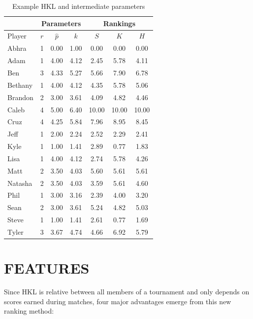 \documentclass[letterpaper, 10 pt, conference]{ieeeconf}  %
\begin{document}
\begin{table}[hb]
        \begin{tabular}{lccc|ccc}
                \toprule
                        & \multicolumn{3}{c}{Parameters} & \multicolumn{3}{c}{Rankings} \\
                \midrule
                Player  & $r$   & $\hat{p}$ & $k$ & $S$ & $K$   & $H$ \\
                \midrule
                Abhra	& 1	& 0.00	& 1.00	& 0.00	& 0.00	& 0.00 \\
                Adam	& 1	& 4.00	& 4.12	& 2.45	& 5.78	& 4.11 \\
                Ben	& 3	& 4.33	& 5.27	& 5.66	& 7.90	& 6.78 \\
                Bethany	& 1	& 4.00	& 4.12	& 4.35	& 5.78	& 5.06 \\
                Brandon	& 2	& 3.00	& 3.61	& 4.09	& 4.82	& 4.46 \\
                Caleb	& 4	& 5.00	& 6.40	& 10.00	& 10.00	& 10.00 \\
                Cruz	& 4	& 4.25	& 5.84	& 7.96	& 8.95	& 8.45 \\
                Jeff	& 1	& 2.00	& 2.24	& 2.52	& 2.29	& 2.41 \\
                Kyle	& 1	& 1.00	& 1.41	& 2.89	& 0.77	& 1.83 \\
                Lisa	& 1	& 4.00	& 4.12	& 2.74	& 5.78	& 4.26 \\
                Matt	& 2	& 3.50	& 4.03	& 5.60	& 5.61	& 5.61 \\
                Natasha	& 2	& 3.50	& 4.03	& 3.59	& 5.61	& 4.60 \\
                Phil	& 1	& 3.00	& 3.16	& 2.39	& 4.00	& 3.20 \\
                Sean	& 2	& 3.00	& 3.61	& 5.24	& 4.82	& 5.03 \\
                Steve	& 1	& 1.00	& 1.41	& 2.61	& 0.77	& 1.69 \\
                Tyler	& 3	& 3.67	& 4.74	& 4.66	& 6.92	& 5.79 \\
                \bottomrule
        \end{tabular}
        \centering
        \caption{Example HKL and intermediate parameters}
        \label{tab:example-ratings}
\end{table}

\section{FEATURES}
Since HKL is relative between all members of a tournament and only depends on scores earned during matches, four major advantages emerge from this new ranking method:
\end{document}
